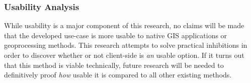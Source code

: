 













\subsubsection*{Usability Analysis} %

While usability is a major component of this research, no claims will be made that the developed use-case is more usable to native GIS applications or geoprocessing methods. This research attempts to solve practical inhibitions in order to discover whether or not client-side is \emph{an} usable option. If it turns out that this method is viable technically, future research will be needed to definitively proof \emph{how} usable it is compared to all other existing methods.  

